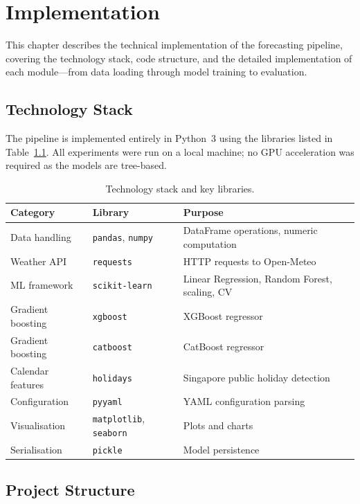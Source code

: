 \chapter{Implementation}\label{ch:Implementation}

This chapter describes the technical implementation of the forecasting pipeline, covering the technology stack, code structure, and the detailed implementation of each module---from data loading through model training to evaluation.


\section{Technology Stack}

The pipeline is implemented entirely in Python~3 using the libraries listed in Table~\ref{tab:tech_stack}. All experiments were run on a local machine; no GPU acceleration was required as the models are tree-based.

\begin{table}[H]
\centering
\caption{Technology stack and key libraries.}
\label{tab:tech_stack}
\begin{tabular}{@{}lll@{}}
\toprule
\textbf{Category} & \textbf{Library} & \textbf{Purpose} \\
\midrule
Data handling & \texttt{pandas}, \texttt{numpy} & DataFrame operations, numeric computation \\
Weather API & \texttt{requests} & HTTP requests to Open-Meteo \\
ML framework & \texttt{scikit-learn} & Linear Regression, Random Forest, scaling, CV \\
Gradient boosting & \texttt{xgboost} & XGBoost regressor \\
Gradient boosting & \texttt{catboost} & CatBoost regressor \\
Calendar features & \texttt{holidays} & Singapore public holiday detection \\
Configuration & \texttt{pyyaml} & YAML configuration parsing \\
Visualisation & \texttt{matplotlib}, \texttt{seaborn} & Plots and charts \\
Serialisation & \texttt{pickle} & Model persistence \\
\bottomrule
\end{tabular}
\end{table}


\section{Project Structure}

